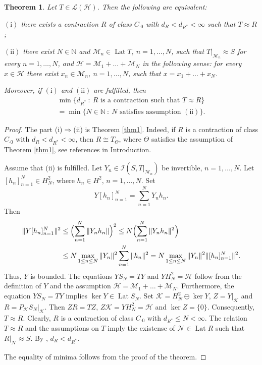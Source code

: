 \documentclass[a4paper,oneside,11pt]{amsart}
\numberwithin{equation}{section}
\theoremstyle{plain}
\newtheorem{theorem}{Theorem}[section]
\theoremstyle{definition}
\begin{document}
\begin{theorem}\label{thmmain} Let $T\in\mathcal L(\mathcal H)$. Then the following are equivalent:

$\mathrm{(i)}$ there exists a contraction $R$ of class $C_{\cdot 0}$ with $d_R<d_{R^*}<\infty$ such that $T\approx R$; 

$\mathrm{(ii)}$  there exist $N\in\mathbb N$ and  $\mathcal M_n\in\operatorname{Lat}T$, $n=1,\ldots, N$, 
such that $T|_{\mathcal M_n}\approx S$ for every  $n=1,\ldots, N$, and 
$\mathcal H=\mathcal M_1+\ldots+\mathcal M_N$ in the following sense: for every $x\in\mathcal H$ there exist 
  $x_n\in\mathcal M_n$, $n=1,\ldots, N$, such that $x=x_1+\ldots+x_N$. 

Moreover, if $\mathrm{(i)}$ and  $\mathrm{(ii)}$ are fulfilled, then  
\begin{align*}\min\{d_{R^*}\ : \ R \text{ is a contraction such that }T\approx R\}\\=\min\{N\in\mathbb N\ :\ N 
\text{  satisfies assumption }\mathrm{(ii)}\}.
\end{align*} 
\end{theorem}

\begin{proof} The part (i)$\Rightarrow$(ii) is Theorem \ref{thm1}. Indeed, if $R$ is  a contraction of class $C_{\cdot 0}$ 
with $d_R<d_{R^*}<\infty$, then $R\cong T_\Theta$, where $\Theta$ satisfies 
the assumption of Theorem \ref{thm1}, see references in Introduction.  

Assume that (ii) is fulfilled. Let
 $Y_n\in\mathcal I(S,T|_{\mathcal M_n})$ be invertible,   $n=1,\ldots, N$. 
Let $[h_n]_{n=1}^N\in H^2_N$, where $h_n\in H^2$,  $n=1,\ldots, N$. 
Set \begin{equation*}Y[h_n]_{n=1}^N=\sum_{n=1}^NY_n h_n. \end{equation*}
Then \begin{align*}\|Y[h_n]_{n=1}^N\|^2 & \leq\Bigl(\sum_{n=1}^N\|Y_n h_n\|\Bigr)^2
\leq N\Bigl(\sum_{n=1}^N\|Y_n h_n\|^2\Bigr)\\ & \leq N\max_{1\leq n\leq N}\|Y_n\|^2\sum_{n=1}^N\|h_n\|^2
=N\max_{1\leq n\leq N}\|Y_n\|^2\|[h_n]_{n=1}^N\|^2. 
 \end{align*}
Thus, $Y$ is bounded. The equations $YS_N=TY$ and $YH^2_N=\mathcal H$ follow from the definition 
of $Y$ and  the  assumption $\mathcal H=\mathcal M_1+\ldots+\mathcal M_N$. Furthermore, the equation $YS_N=TY$ 
implies $\ker Y\in\operatorname{Lat}S_N$. Set $\mathcal K=H^2_N\ominus\ker Y$, 
$Z=Y|_{\mathcal K}$ and $R=P_{\mathcal K}S_N|_{\mathcal K}$. Then $ZR=TZ$, $Z\mathcal K=YH^2_N=\mathcal H$ 
and $\ker Z=\{0\}$. Consequently, $T\approx R$. Clearly, $R$ is a contraction of class $C_{\cdot 0}$ with 
$d_{R^*}\leq N<\infty$. The relation $T\approx R$ and the assumptions on $T$ imply the existense of 
$\mathcal N\in \operatorname{Lat}R$ such that $R|_{\mathcal N}\approx S$. By \cite{sznf74}, $d_R<d_{R^*}$. 

The equality of minima follows from  the proof of the theorem.
 \end{proof}
\end{document}
